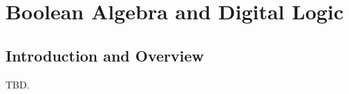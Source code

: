 \chapter{Boolean Algebra and Digital Logic}
\label{cbal0}

\section{Introduction and Overview}
\label{cbal0:siov0}

TBD.

